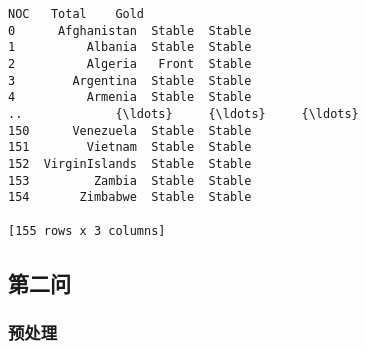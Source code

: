 \documentclass[11pt]{article}
\begin{document}
    \begin{Verbatim}[commandchars=\\\{\}]
               NOC   Total    Gold
0      Afghanistan  Stable  Stable
1          Albania  Stable  Stable
2          Algeria   Front  Stable
3        Argentina  Stable  Stable
4          Armenia  Stable  Stable
..             {\ldots}     {\ldots}     {\ldots}
150      Venezuela  Stable  Stable
151        Vietnam  Stable  Stable
152  VirginIslands  Stable  Stable
153         Zambia  Stable  Stable
154       Zimbabwe  Stable  Stable

[155 rows x 3 columns]
    \end{Verbatim}

    \subsection{第二问}\label{ux7b2cux4e8cux95ee}

    \subsubsection{预处理}\label{ux9884ux5904ux7406}
\end{document}
